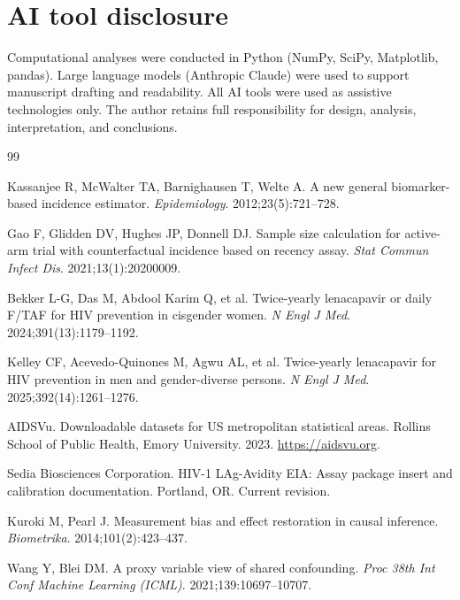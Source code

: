 \documentclass[12pt]{article}
\begin{document}
\section*{AI tool disclosure}

Computational analyses were conducted in Python (NumPy, SciPy, Matplotlib, pandas). Large language models (Anthropic Claude) were used to support manuscript drafting and readability. All AI tools were used as assistive technologies only. The author retains full responsibility for design, analysis, interpretation, and conclusions.


\begin{thebibliography}{99}

 Kassanjee R, McWalter TA, Barnighausen T, Welte A. A new general biomarker-based incidence estimator. \textit{Epidemiology}. 2012;23(5):721--728.

 Gao F, Glidden DV, Hughes JP, Donnell DJ. Sample size calculation for active-arm trial with counterfactual incidence based on recency assay. \textit{Stat Commun Infect Dis}. 2021;13(1):20200009.

 Bekker L-G, Das M, Abdool Karim Q, et al. Twice-yearly lenacapavir or daily F/TAF for HIV prevention in cisgender women. \textit{N Engl J Med}. 2024;391(13):1179--1192.

 Kelley CF, Acevedo-Quinones M, Agwu AL, et al. Twice-yearly lenacapavir for HIV prevention in men and gender-diverse persons. \textit{N Engl J Med}. 2025;392(14):1261--1276.

 AIDSVu. Downloadable datasets for US metropolitan statistical areas. Rollins School of Public Health, Emory University. 2023. \url{https://aidsvu.org}.

 Sedia Biosciences Corporation. HIV-1 LAg-Avidity EIA: Assay package insert and calibration documentation. Portland, OR. Current revision.

 Kuroki M, Pearl J. Measurement bias and effect restoration in causal inference. \textit{Biometrika}. 2014;101(2):423--437.

 Wang Y, Blei DM. A proxy variable view of shared confounding. \textit{Proc 38th Int Conf Machine Learning (ICML)}. 2021;139:10697--10707.


\end{thebibliography}
\end{document}
